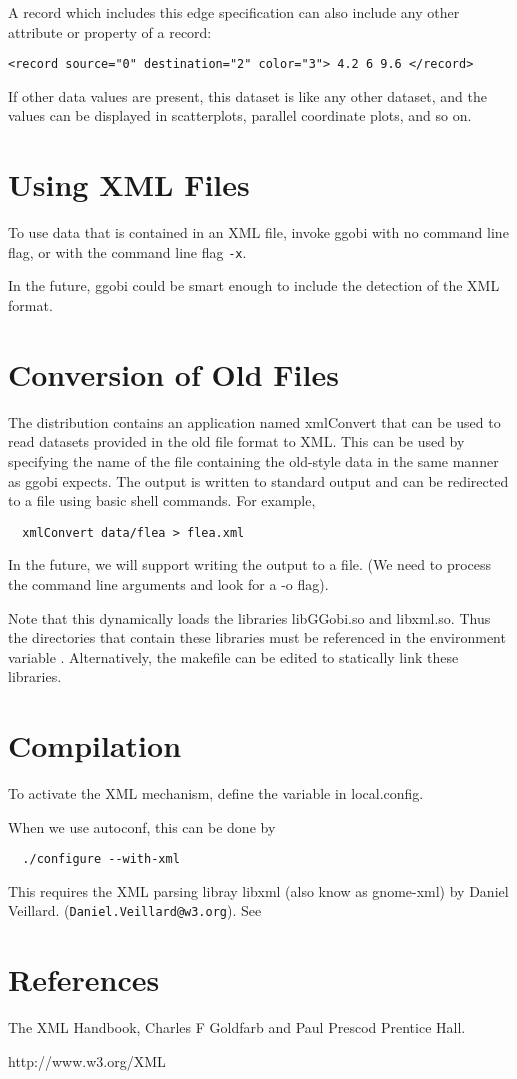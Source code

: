 \documentclass{article}
\begin{document}
A record which includes this edge specification can also include
any other attribute or property of a record:
\begin{verbatim}
<record source="0" destination="2" color="3"> 4.2 6 9.6 </record>
\end{verbatim}
%
If other data values are present, this dataset is like any other
dataset, and the values can be displayed in scatterplots, 
parallel coordinate plots, and so on.


\section{Using XML Files}
To use data that is contained in an XML file, invoke ggobi with no
command line flag, or with the command line flag \texttt{-x}.

In the future, ggobi could be smart enough to include the detection of
the XML format.

\section{Conversion of Old Files}
The distribution contains an application named xmlConvert that can be
used to read datasets provided in the old file format to XML.  This
can be used by specifying the name of the file containing the
old-style data in the same manner as ggobi expects.
The output is written to standard output
and can be redirected to a file using basic shell commands.
For example,
\begin{verbatim}
  xmlConvert data/flea > flea.xml
\end{verbatim}
In the future, we will support writing the output to a file. (We need
to process the command line arguments and look for a -o flag).


Note that this dynamically loads the libraries libGGobi.so and
libxml.so.  Thus the directories that contain these libraries must be
referenced in the environment variable 
.
Alternatively, the makefile can be edited to statically link these
libraries.


\section{Compilation}
To activate the XML mechanism, define the variable
 in  local.config.

When we use autoconf, this can be done by
\begin{verbatim}
  ./configure --with-xml
\end{verbatim}

This requires the XML parsing libray libxml (also know as gnome-xml) by Daniel Veillard.
(\texttt{Daniel.Veillard@w3.org}).
See 
\section{References}
The XML Handbook, Charles F Goldfarb and Paul Prescod
 Prentice Hall.

http://www.w3.org/XML
\end{document}
